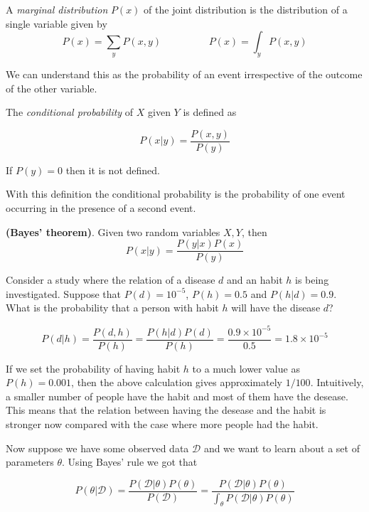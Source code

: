 \begin{definition}
A \emph{marginal distribution} \(P(x)\) of the joint distribution is the
distribution of a single variable given by
\[
P(x) = \sum_y P(x,y) \hspace{2cm} P(x) = \int_y P(x,y)
\]
\end{definition}

We can understand this as the probability of an event irrespective of the outcome
of the other variable.

\begin{definition}
The \emph{conditional probability} of \(X\) given \(Y\) is defined as

\[
P(x|y) = \frac{P(x,y)}{P(y)}
\]

If \(P(y) = 0\) then it is not defined.
\end{definition}

With this definition the
conditional probability is the probability of one event occurring in the presence of a
second event. \\

\begin{theorem}
  \textbf{(Bayes' theorem)}. Given two random variables \(X,Y\), then
  \[
  P(x|y)= \frac{P(y|x)P(x)}{P(y)}
  \]
\end{theorem}

\begin{exampleth}
Consider a study where the relation of a disease \(d\) and an habit \(h\)
is being investigated. Suppose that \(P(d)=10^{-5}\), \(P(h)=0.5\) and \(P(h|d) = 0.9\). What is the
probability that a person with habit \(h\) will have the disease \(d\)?

\[
P(d|h) = \frac{P(d,h)}{P(h)} = \frac{P(h|d)P(d)}{P(h)} =
\frac{ 0.9 \times 10^{-5}}{ 0.5 } = 1.8 \times 10^{-5}
\]

If we set the probability of having habit \(h\) to a much lower value as \(P(h) =
0.001\), then the above calculation gives approximately \(1/100\). Intuitively, a smaller number of people have the habit and most of them have the
desease. This means that the relation between having the desease and the habit
is stronger now compared with the case where more people had the habit.
\end{exampleth}

Now suppose we have some observed data \(\mathcal{D}\) and we want to learn about
a set of parameters \(\theta\). Using Bayes' rule we got that

\[
P(\theta|\mathcal{D}) = \frac{P(\mathcal{D}|\theta)P(\theta)}{P(\mathcal{D})} =
\frac{P(\mathcal{D}|\theta)P(\theta)}{ \int_{\theta} P(\mathcal{D}|\theta)P(\theta)}
\]

